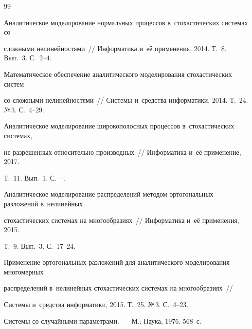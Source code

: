 {{\begin{thebibliography}{99}


Аналитическое моделирование нормальных процессов в~стохастических системах со 

сложными нелинейностями~/\!\!/ Информатика и~её применения, 2014. Т.~8. Вып.~3. С.~2--4.





Математическое обеспечение аналитического моделирования стохастических систем 

со сложными нелинейностями~/\!\!/ Системы и~средства информатики, 2014. Т.~24. №\,3. С.~4--29.





Аналитическое моделирование широкополосных процессов в~стохастических системах, 

не разрешенных относительно производных~/\!\!/ Информатика и~её применение, 2017. 

Т.~11. Вып.~1. С.~\pageref{stsin-1}--\pageref{endsin-1}.





Аналитическое моделирование распределений методом ортогональных разложений в~нелинейных 

стохастических системах на многообразиях~/\!\!/ Информатика и~её применения, 2015. 

Т.~9. Вып.~3. С.~17--24.





Применение ортогональных разложений для аналитического моделирования многомерных 

распределений в~нелинейных стохастических системах на многообразиях~/\!\!/ 

Системы и~средства информатики, 2015. Т.~25. №\,3. С.~4--23.





Системы со случайными параметрами.~--- М.: Наука, 1976. 568~с.




\end{thebibliography}}}
